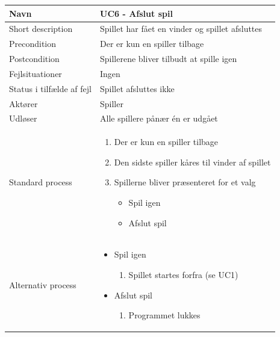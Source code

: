 \newpage
\begin{center}
\begin{longtable}{|l|p{11cm}|}
\hline
Navn &  UC6 - Afslut spil\\
\hline
Short description & Spillet har fået en vinder og spillet afsluttes \\
\hline
Precondition & Der er kun en spiller tilbage \\
\hline
Postcondition & Spillerene bliver tilbudt at spille igen \\
\hline
Fejlsituationer & Ingen \\
\hline
Status i tilfælde af fejl & Spillet afsluttes ikke \\
\hline
Aktører & Spiller \\
\hline
Udløser & Alle spillere pånær én er udgået \\
\hline
Standard process &  
\begin{minipage}[t]{1\textwidth}
  \begin{enumerate}
      \item Der er kun en spiller tilbage
      \item Den sidste spiller kåres til vinder af spillet
      \item Spillerne bliver præsenteret for et valg
      \begin{itemize}
          \item Spil igen 
          \newline
          \item Afslut spil 
          \newline
      \end{itemize}
  \end{enumerate} 
  \end{minipage}
\\
\hline
Alternativ process & 
\begin{minipage}[t]{1\textwidth}
 \begin{itemize}
 \vspace{0.5cm}
     \item Spil igen
        \begin{enumerate}
            \item Spillet startes forfra (se UC1)
        \end{enumerate}
    \item Afslut spil
    \begin{enumerate}
        \item Programmet lukkes
    \end{enumerate}
 \end{itemize}
\end{minipage}

\\
\hline
\end{longtable}
\end{center}